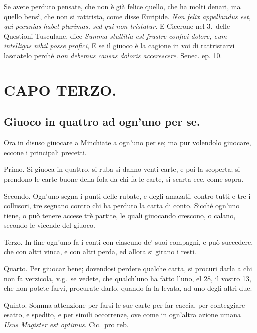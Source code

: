 \documentclass[11pt,a6paper]{article}
\begin{document}
Se avete perduto pensate, che non è già
felice quello, che ha molti denari, ma quello
bensì, che non si rattrista, come disse
Euripide. \textit{Non felix appellandus est, qui pecunias
habet plurimas, sed qui non tristatur.}
E Cicerone nel 3.\ delle Questioni Tusculane,
dice \textit{Summa stultitia est frustre confici dolore,
 cum intelligas nihil posse profici}, E se il giuoco
è la cagione in voi di rattristarvi lasciatelo
perché \textit{non debemus causas doloris accerescere}. Senec. ep. 10.


\section{CAPO TERZO.}

\subsection{Giuoco in quattro ad ogn'uno per se.}

Ora in disuso giuocare a Minchiate a ogn'uno per se; ma pur volendolo giuocare,
eccone i principali precetti.

Primo. Si giuoca in quattro, si ruba si
danno venti carte, e poi la scoperta; si
prendono le carte buone della fola da chi fa le
carte, si scarta ecc. come sopra.

Secondo. Ogn'uno segna i punti delle
rubate, e degli amazati, contro tutti e tre i
collusori, tre segnano contro chi ha perduto
la carta di conto. Sicché ogn'uno tiene, o
può tenere accese trè partite, le quali
giuocando crescono, o calano, secondo le
vicende del giuoco.

Terzo. In fine ogn'uno fa i conti con
ciascuno de' suoi compagni, e può
succedere, che con altri vinca, e con altri perda, ed
allora si girano i resti.

Quarto. Per giuocar bene; dovendosi
perdere qualche carta, si procuri darla a chi
non fa verzicola, v.g.\ se vedete, che
qualch'uno ha fatto l'uno, el 28, il vostro 13, che
non potete farvi, procurate darlo, quando
fa la levata, ad uno degli altri due.

Quinto. Somma attenzione per farsi le
sue carte per far caccia, per conteggiare
esatto, e spedito, e per simili occorrenze, ove
come in ogn'altra azione umana \textit{Usus Magister est optimus}. Cic.\ pro reb.
\end{document}
